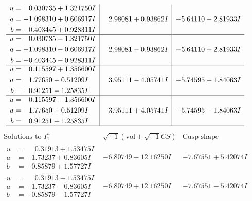 \documentclass[1p]{elsarticle_modified}
\theoremstyle{definition}
\newcommand{\I}{\sqrt{-1}}
\begin{document}
$$\begin{array}{c|c|c}
\begin{aligned}
u &= \phantom{-}0.030735 + 1.321750 I \\
a &= -1.098310 + 0.606917 I \\
b &= -0.403445 + 0.928311 I\end{aligned}
 & \phantom{-}2.98081 + 0.93862 I & -5.64110 - 2.81933 I \\ \hline\begin{aligned}
u &= \phantom{-}0.030735 - 1.321750 I \\
a &= -1.098310 - 0.606917 I \\
b &= -0.403445 - 0.928311 I\end{aligned}
 & \phantom{-}2.98081 - 0.93862 I & -5.64110 + 2.81933 I \\ \hline\begin{aligned}
u &= \phantom{-}0.115597 + 1.356600 I \\
a &= \phantom{-}1.77650 - 0.51209 I \\
b &= \phantom{-}0.91251 - 1.25835 I\end{aligned}
 & \phantom{-}3.95111 - 4.05741 I & -5.74595 + 1.84063 I \\ \hline\begin{aligned}
u &= \phantom{-}0.115597 - 1.356600 I \\
a &= \phantom{-}1.77650 + 0.51209 I \\
b &= \phantom{-}0.91251 + 1.25835 I\end{aligned}
 & \phantom{-}3.95111 + 4.05741 I & -5.74595 - 1.84063 I\\
 \hline 
 \end{array}$$\newpage$$\begin{array}{c|c|c}  
\text{Solutions to }I^u_{1}& \I (\text{vol} + \sqrt{-1}CS) & \text{Cusp shape}\\
 \hline 
\begin{aligned}
u &= \phantom{-}0.31913 + 1.53475 I \\
a &= -1.73237 + 0.83605 I \\
b &= -0.85879 + 1.57727 I\end{aligned}
 & -6.80749 - 12.16250 I & -7.67551 + 5.42074 I \\ \hline\begin{aligned}
u &= \phantom{-}0.31913 - 1.53475 I \\
a &= -1.73237 - 0.83605 I \\
b &= -0.85879 - 1.57727 I\end{aligned}
 & -6.80749 + 12.16250 I & -7.67551 - 5.42074 I \\ \hline\begin{aligned}

\end{aligned}
\end{array}$$
\end{document}
